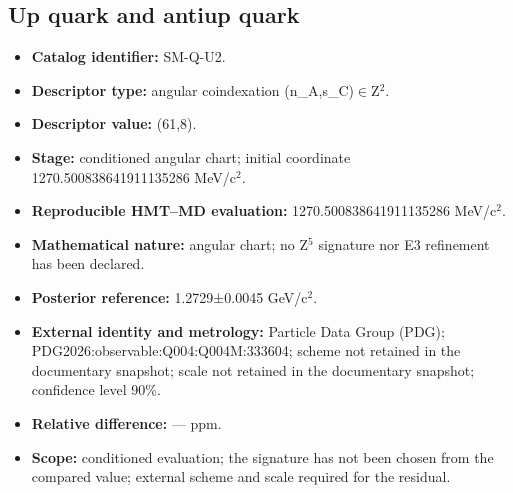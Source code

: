 \subsection{Up quark and antiup quark}
\begin{itemize}
\item \textbf{Catalog identifier:} SM-Q-U2.
\item \textbf{Descriptor type:} angular coindexation (n\_A,s\_C)\(\in\)Z\({}^{2}\).
\item \textbf{Descriptor value:} (61,8).
\item \textbf{Stage:} conditioned angular chart; initial coordinate 1270.500838\allowbreak{}641911\allowbreak{}135286 MeV/c\({}^{2}\).
\item \textbf{Reproducible HMT--MD evaluation:} 1270.500838\allowbreak{}641911\allowbreak{}135286 MeV/c\({}^{2}\).
\item \textbf{Mathematical nature:} angular chart; no Z\({}^{5}\) signature nor E3 refinement has been declared.
\item \textbf{Posterior reference:} 1.2729±\allowbreak{}0.0045 GeV/c\({}^{2}\).
\item \textbf{External identity and metrology:} Particle Data Group (PDG); PDG2026:\allowbreak{}observable:\allowbreak{}Q004:\allowbreak{}Q004M:\allowbreak{}333604; scheme not retained in the documentary snapshot; scale not retained in the documentary snapshot; confidence level 90\%.
\item \textbf{Relative difference:} --- ppm.
\item \textbf{Scope:} conditioned evaluation; the signature has not been chosen from the compared value; external scheme and scale required for the residual.
\end{itemize}
